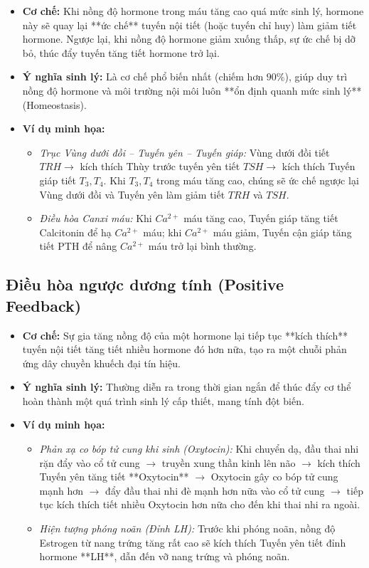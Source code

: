 \begin{itemize}
    \item \textbf{Cơ chế:} Khi nồng độ hormone trong máu tăng cao quá mức sinh lý, hormone này sẽ quay lại **ức chế** tuyến nội tiết (hoặc tuyến chỉ huy) làm giảm tiết hormone. Ngược lại, khi nồng độ hormone giảm xuống thấp, sự ức chế bị dỡ bỏ, thúc đẩy tuyến tăng tiết hormone trở lại.
    \item \textbf{Ý nghĩa sinh lý:} Là cơ chế phổ biến nhất (chiếm hơn $90\%$), giúp duy trì nồng độ hormone và môi trường nội môi luôn **ổn định quanh mức sinh lý** (Homeostasis).
    \item \textbf{Ví dụ minh họa:}
    \begin{itemize}
        \item \textit{Trục Vùng dưới đồi -- Tuyến yên -- Tuyến giáp:} Vùng dưới đồi tiết $TRH \rightarrow$ kích thích Thùy trước tuyến yên tiết $TSH \rightarrow$ kích thích Tuyến giáp tiết $T_3, T_4$. Khi $T_3, T_4$ trong máu tăng cao, chúng sẽ ức chế ngược lại Vùng dưới đồi và Tuyến yên làm giảm tiết $TRH$ và $TSH$.
        \item \textit{Điều hòa Canxi máu:} Khi $Ca^{2+}$ máu tăng cao, Tuyến giáp tăng tiết Calcitonin để hạ $Ca^{2+}$ máu; khi $Ca^{2+}$ máu giảm, Tuyến cận giáp tăng tiết PTH để nâng $Ca^{2+}$ máu trở lại bình thường.
    \end{itemize}
\end{itemize}

\subsection{Điều hòa ngược dương tính (Positive Feedback)}

\begin{itemize}
    \item \textbf{Cơ chế:} Sự gia tăng nồng độ của một hormone lại tiếp tục **kích thích** tuyến nội tiết tăng tiết nhiều hormone đó hơn nữa, tạo ra một chuỗi phản ứng dây chuyền khuếch đại tín hiệu.
    \item \textbf{Ý nghĩa sinh lý:} Thường diễn ra trong thời gian ngắn để thúc đẩy cơ thể hoàn thành một quá trình sinh lý cấp thiết, mang tính đột biến.
    \item \textbf{Ví dụ minh họa:}
    \begin{itemize}
        \item \textit{Phản xạ co bóp tử cung khi sinh (Oxytocin):} Khi chuyển dạ, đầu thai nhi rặn đẩy vào cổ tử cung $\rightarrow$ truyền xung thần kinh lên não $\rightarrow$ kích thích Tuyến yên tăng tiết **Oxytocin** $\rightarrow$ Oxytocin gây co bóp tử cung mạnh hơn $\rightarrow$ đẩy đầu thai nhi đè mạnh hơn nữa vào cổ tử cung $\rightarrow$ tiếp tục kích thích tiết nhiều Oxytocin hơn nữa cho đến khi thai nhi ra ngoài.
        \item \textit{Hiện tượng phóng noãn (Đỉnh LH):} Trước khi phóng noãn, nồng độ Estrogen từ nang trứng tăng rất cao sẽ kích thích Tuyến yên tiết đỉnh hormone **LH**, dẫn đến vỡ nang trứng và phóng noãn.
    \end{itemize}
\end{itemize}

